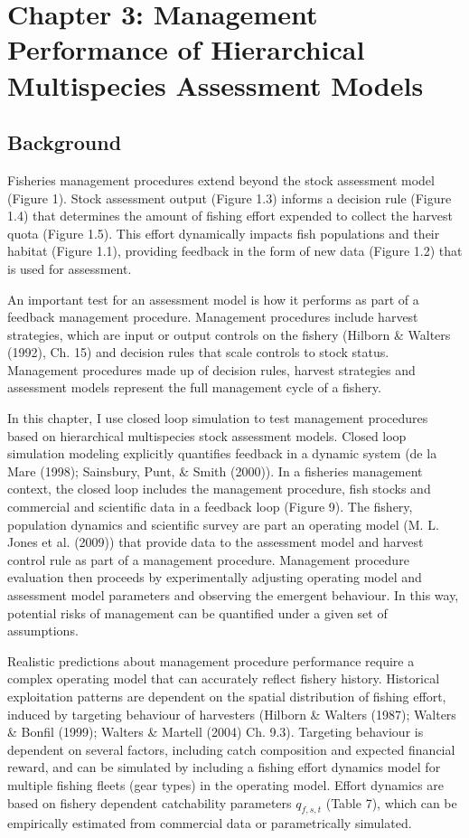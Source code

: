 \documentclass[12pt,]{scrartcl}
\begin{document}
\section{Chapter 3: Management Performance of Hierarchical Multispecies
Assessment
Models}\label{chapter-3-management-performance-of-hierarchical-multispecies-assessment-models}

\subsection{Background}\label{background-3}

Fisheries management procedures extend beyond the stock assessment model
(Figure 1). Stock assessment output (Figure 1.3) informs a decision rule
(Figure 1.4) that determines the amount of fishing effort expended to
collect the harvest quota (Figure 1.5). This effort dynamically impacts
fish populations and their habitat (Figure 1.1), providing feedback in
the form of new data (Figure 1.2) that is used for assessment.

An important test for an assessment model is how it performs as part of
a feedback management procedure. Management procedures include harvest
strategies, which are input or output controls on the fishery (Hilborn
\& Walters (1992), Ch. 15) and decision rules that scale controls to
stock status. Management procedures made up of decision rules, harvest
strategies and assessment models represent the full management cycle of
a fishery.

In this chapter, I use closed loop simulation to test management
procedures based on hierarchical multispecies stock assessment models.
Closed loop simulation modeling explicitly quantifies feedback in a
dynamic system (de la Mare (1998); Sainsbury, Punt, \& Smith (2000)). In
a fisheries management context, the closed loop includes the management
procedure, fish stocks and commercial and scientific data in a feedback
loop (Figure 9). The fishery, population dynamics and scientific survey
are part an operating model (M. L. Jones et al. (2009)) that provide
data to the assessment model and harvest control rule as part of a
management procedure. Management procedure evaluation then proceeds by
experimentally adjusting operating model and assessment model parameters
and observing the emergent behaviour. In this way, potential risks of
management can be quantified under a given set of assumptions.

Realistic predictions about management procedure performance require a
complex operating model that can accurately reflect fishery history.
Historical exploitation patterns are dependent on the spatial
distribution of fishing effort, induced by targeting behaviour of
harvesters (Hilborn \& Walters (1987); Walters \& Bonfil (1999); Walters
\& Martell (2004) Ch. 9.3). Targeting behaviour is dependent on several
factors, including catch composition and expected financial reward, and
can be simulated by including a fishing effort dynamics model for
multiple fishing fleets (gear types) in the operating model. Effort
dynamics are based on fishery dependent catchability parameters
\(q_{f,s,t}\) (Table 7), which can be empirically estimated from
commercial data or parametrically simulated.
\end{document}
